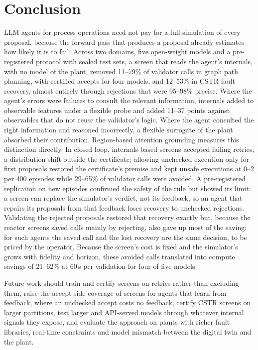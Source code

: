 \section{Conclusion}\label{sec:conclusion}

LLM agents for process operations need not pay for a full simulation of every proposal, because the forward pass
that produces a proposal already estimates how likely it is to fail. Across two domains, five open-weight models
and a pre-registered protocol with sealed test sets, a screen that reads the agent's internals, with no model of
the plant, removed 11--79\% of validator calls in graph path planning, with certified accepts for four models,
and 12--53\% in CSTR fault recovery, almost entirely through rejections that were 95--98\% precise. Where the agent's errors were
failures to consult the relevant information, internals added to observable features under a flexible probe and
added 11--37 points against observables that do not reuse the validator's logic. Where the agent consulted the
right information and reasoned incorrectly, a flexible surrogate of the plant absorbed their contribution.
Region-based attention grounding measures this distinction directly. In closed loop,
internals-based screens accepted failing retries, a distribution shift outside the certificate; allowing
unchecked execution only for first proposals restored the certificate's premise and kept unsafe executions at
0--2 per 400 episodes while 29--65\% of validator calls were avoided. A pre-registered replication on new
episodes confirmed the safety of the rule but showed its limit: a screen can replace the simulator's verdict, not
its feedback, so an agent that repairs its proposals from that feedback loses recovery to unchecked rejections.
Validating the rejected proposals restored that recovery exactly but, because the reactor screens saved calls
mainly by rejecting, also gave up most of the saving: for such agents the saved call and the lost recovery are the
same decision, to be priced by the operator.
Because the screen's cost is fixed and the
simulator's grows with fidelity and horizon, these avoided calls translated into compute savings of 21--62\% at
60\,s per validation for four of five models.

Future work should train and certify screens on retries rather than excluding them, raise the accept-side
coverage of screens for agents that learn from feedback, where an unchecked accept costs no feedback, certify CSTR screens on larger
partitions, test larger and API-served models through whatever internal signals they expose, and evaluate the
approach on plants with richer fault libraries, real-time constraints and model mismatch between the digital twin
and the plant.
